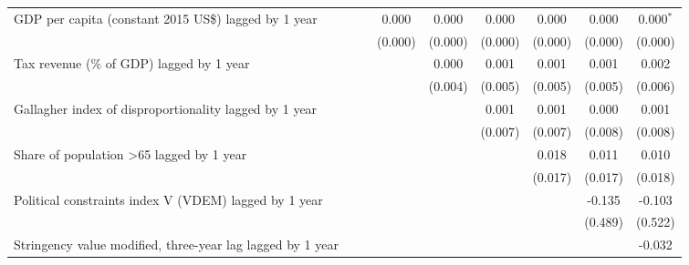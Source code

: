 \begin{tabular}{lcccccccc}
   GDP per capita (constant 2015 US\$) lagged by 1 year               &                &                & 0.000          & 0.000          & 0.000          & 0.000          & 0.000          & 0.000$^{*}$\\   
                                                                      &                &                & (0.000)        & (0.000)        & (0.000)        & (0.000)        & (0.000)        & (0.000)\\   
   Tax revenue (\% of GDP) lagged by 1 year                           &                &                &                & 0.000          & 0.001          & 0.001          & 0.001          & 0.002\\   
                                                                      &                &                &                & (0.004)        & (0.005)        & (0.005)        & (0.005)        & (0.006)\\   
   Gallagher index of disproportionality lagged by 1 year             &                &                &                &                & 0.001          & 0.001          & 0.000          & 0.001\\   
                                                                      &                &                &                &                & (0.007)        & (0.007)        & (0.008)        & (0.008)\\   
   Share of population >65 lagged by 1 year                           &                &                &                &                &                & 0.018          & 0.011          & 0.010\\   
                                                                      &                &                &                &                &                & (0.017)        & (0.017)        & (0.018)\\   
   Political constraints index V (VDEM) lagged by 1 year              &                &                &                &                &                &                & -0.135         & -0.103\\   
                                                                      &                &                &                &                &                &                & (0.489)        & (0.522)\\   
   Stringency value modified, three-year lag lagged by 1 year         &                &                &                &                &                &                &                & -0.032\\   

\end{tabular}

